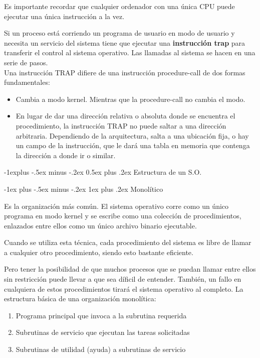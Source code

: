 \documentclass[10pt,portrait, twocolumn]{article}
\makeatletter
\renewcommand{\subsection}{\@startsection{subsection}{2}{0mm}%
                                {-1explus -.5ex minus -.2ex}%
                                {0.5ex plus .2ex}%
                                {\normalfont\normalsize\bfseries}}
\renewcommand{\subsubsection}{\@startsection{subsubsection}{3}{0mm}%
                                {-1ex plus -.5ex minus -.2ex}%
                                {1ex plus .2ex}%
                                {\normalfont\small\bfseries}}
\makeatother
\begin{document}
Es importante recordar que cualquier ordenador con una única CPU puede ejecutar una única instrucción a la vez. 

	\quad Si un proceso está corriendo un programa de usuario en modo de usuario y necesita un servicio del sistema tiene que ejecutar una \textbf{instrucción trap} para transferir el control al sistema operativo. Las llamadas al sistema se hacen en una serie de pasos.\\

Una instrucción TRAP difiere de una instrucción procedure-call  de dos formas fundamentales:

	\begin{itemize}
		\item Cambia a modo kernel. Mientras que la procedure-call no cambia el modo.
		\item En lugar de dar una dirección relativa o absoluta donde se encuentra el procedimiento, la instrucción TRAP no puede saltar a una dirección arbitraria. Dependiendo de la arquitectura, salta a una ubicación fija, o hay un campo de la instrucción, que le dará una tabla en memoria que contenga la dirección a donde ir o similar.
	\end{itemize}
	
\subsection{Estructura de un S.O.}

\subsubsection{Monolítico}

Es la organización más común. El sistema operativo corre como un único programa en modo kernel y se escribe como una colección de procedimientos, enlazados entre ellos como un único archivo binario ejecutable. 

	\quad Cuando se utiliza esta técnica, cada procedimiento del sistema es libre de llamar a cualquier otro procedimiento, siendo esto bastante eficiente. 
	
	\quad Pero tener la posibilidad de que muchos procesos que se puedan llamar entre ellos sin restricción puede llevar a que sea díficil de entender. También, un fallo en cualquiera de estos procedimientos tirará el sistema operativo al completo.
La estructura básica de una organización monolítica:
	
	\begin{enumerate}
		\item Programa principal que invoca a la subrutina requerida
		\item Subrutinas de servicio que ejecutan las tareas solicitadas
		\item Subrutinas de utilidad (ayuda) a subrutinas de servicio
	\end{enumerate}
\end{document}
